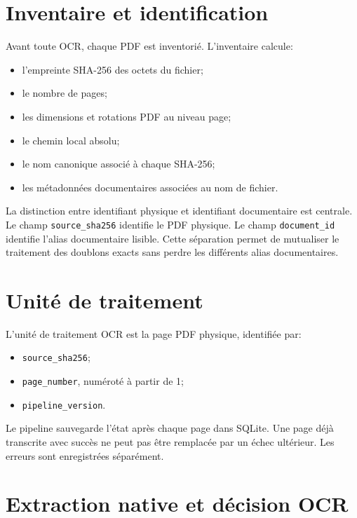 \documentclass[11pt,a4paper]{article}
\begin{document}
\section{Inventaire et identification}

Avant toute OCR, chaque PDF est inventorié. L'inventaire calcule:

\begin{itemize}
  \item l'empreinte SHA-256 des octets du fichier;
  \item le nombre de pages;
  \item les dimensions et rotations PDF au niveau page;
  \item le chemin local absolu;
  \item le nom canonique associé à chaque SHA-256;
  \item les métadonnées documentaires associées au nom de fichier.
\end{itemize}

La distinction entre identifiant physique et identifiant documentaire est centrale. Le champ \texttt{source\_sha256} identifie le PDF physique. Le champ \texttt{document\_id} identifie l'alias documentaire lisible. Cette séparation permet de mutualiser le traitement des doublons exacts sans perdre les différents alias documentaires.

\section{Unité de traitement}

L'unité de traitement OCR est la page PDF physique, identifiée par:

\begin{itemize}
  \item \texttt{source\_sha256};
  \item \texttt{page\_number}, numéroté à partir de 1;
  \item \texttt{pipeline\_version}.
\end{itemize}

Le pipeline sauvegarde l'état après chaque page dans SQLite. Une page déjà transcrite avec succès ne peut pas être remplacée par un échec ultérieur. Les erreurs sont enregistrées séparément.

\section{Extraction native et décision OCR}
\end{document}
